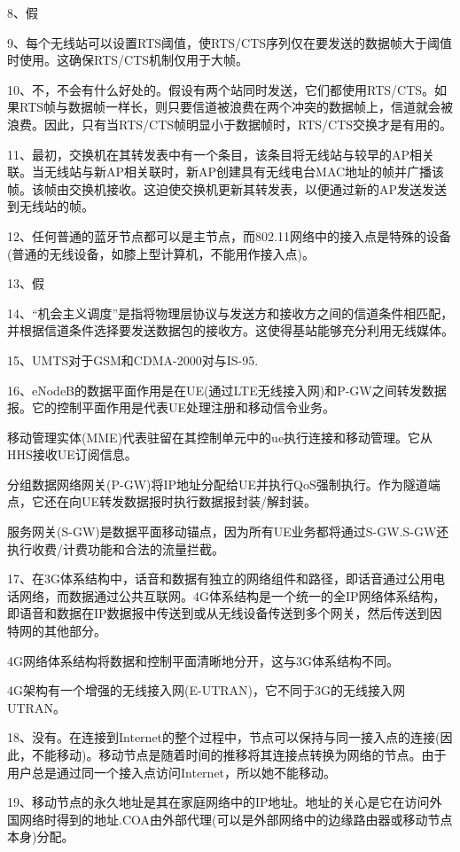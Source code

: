\documentclass[11pt,UTF8,twoside]{article}
\begin{document}
{		8、假
		
		9、每个无线站可以设置RTS阈值，使RTS/CTS序列仅在要发送的数据帧大于阈值时使用。这确保RTS/CTS机制仅用于大帧。
		
		10、不，不会有什么好处的。假设有两个站同时发送，它们都使用RTS/CTS。如果RTS帧与数据帧一样长，则只要信道被浪费在两个冲突的数据帧上，信道就会被浪费。因此，只有当RTS/CTS帧明显小于数据帧时，RTS/CTS交换才是有用的。
		
		11、最初，交换机在其转发表中有一个条目，该条目将无线站与较早的AP相关联。当无线站与新AP相关联时，新AP创建具有无线电台MAC地址的帧并广播该帧。该帧由交换机接收。这迫使交换机更新其转发表，以便通过新的AP发送发送到无线站的帧。
		
		12、任何普通的蓝牙节点都可以是主节点，而802.11网络中的接入点是特殊的设备(普通的无线设备，如膝上型计算机，不能用作接入点)。
		
		13、假
		
		14、“机会主义调度”是指将物理层协议与发送方和接收方之间的信道条件相匹配，并根据信道条件选择要发送数据包的接收方。这使得基站能够充分利用无线媒体。
		
		15、UMTS对于GSM和CDMA-2000对与IS-95.
		
		16、eNodeB的数据平面作用是在UE(通过LTE无线接入网)和P-GW之间转发数据报。它的控制平面作用是代表UE处理注册和移动信令业务。
		
		移动管理实体(MME)代表驻留在其控制单元中的ue执行连接和移动管理。它从HHS接收UE订阅信息。
		
		分组数据网络网关(P-GW)将IP地址分配给UE并执行QoS强制执行。作为隧道端点，它还在向UE转发数据报时执行数据报封装/解封装。
		
		服务网关(S-GW)是数据平面移动锚点，因为所有UE业务都将通过S-GW.S-GW还执行收费/计费功能和合法的流量拦截。
		
		17、在3G体系结构中，话音和数据有独立的网络组件和路径，即话音通过公用电话网络，而数据通过公共互联网。4G体系结构是一个统一的全IP网络体系结构，即语音和数据在IP数据报中传送到或从无线设备传送到多个网关，然后传送到因特网的其他部分。
		
		4G网络体系结构将数据和控制平面清晰地分开，这与3G体系结构不同。
		
		4G架构有一个增强的无线接入网(E-UTRAN)，它不同于3G的无线接入网UTRAN。
		
		18、没有。在连接到Internet的整个过程中，节点可以保持与同一接入点的连接(因此，不能移动)。移动节点是随着时间的推移将其连接点转换为网络的节点。由于用户总是通过同一个接入点访问Internet，所以她不能移动。
		
		19、移动节点的永久地址是其在家庭网络中的IP地址。地址的关心是它在访问外国网络时得到的地址.COA由外部代理(可以是外部网络中的边缘路由器或移动节点本身)分配。
		
}
\end{document}

